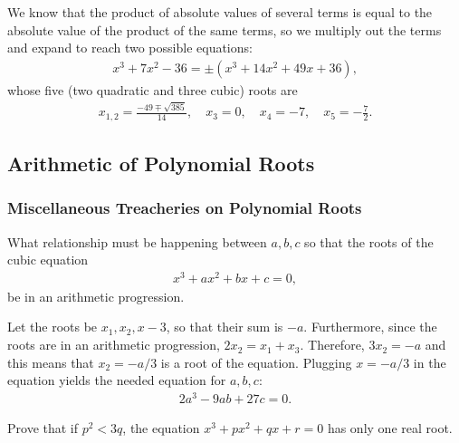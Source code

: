 \begin{solution}
    We know that the product of absolute values of several terms is equal to the absolute value of the product of the same terms, so we multiply out the terms and expand to reach two possible equations:
    \begin{align*}
        x^3 + 7x^2 - 36 = \pm(x^3 + 14x^2 +49x + 36),
    \end{align*}
    whose five (two quadratic and three cubic) roots are
    \begin{align*}
        x_{1,2}=\frac{-49\mp\sqrt{385}}{14}, \quad x_3=0, \quad x_4=-7, \quad x_5=-\frac{7}{2}.
    \end{align*}
\end{solution}

\subsection{Arithmetic of Polynomial Roots}

\subsubsection{Miscellaneous Treacheries on Polynomial Roots}

\begin{question}
    What relationship must be happening between $a,b,c$ so that the roots of the cubic equation
    \begin{align*}
        x^3+ax^2+bx+c=0,
    \end{align*}
    be in an arithmetic progression.
\end{question}

\begin{solution}
    Let the roots be $x_1,x_2,x-3$, so that their sum is $-a$. Furthermore, since the roots are in an arithmetic progression, $2x_2=x_1+x_3$. Therefore, $3x_2=-a$ and this means that $x_2=-a/3$ is a root of the equation. Plugging $x=-a/3$ in the equation yields the needed equation for $a,b,c$: 
    \begin{align*}
        2a^3-9ab+27c=0.
    \end{align*}
\end{solution}


\begin{question}
    Prove that if $p^2<3q$, the equation $x^3+px^2+qx+r=0$ has only one real root.
\end{question}


